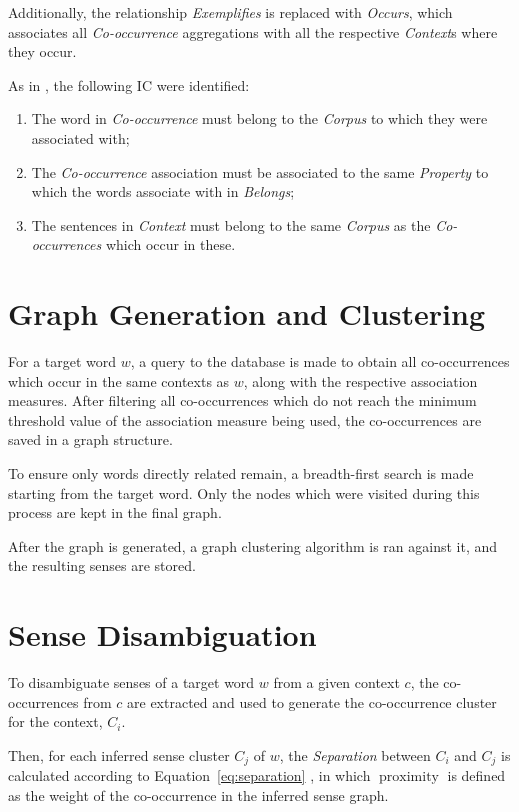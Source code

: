 Additionally, the relationship \emph{Exemplifies} is replaced with
\emph{Occurs}, which associates all \emph{Co-occurrence} aggregations with all
the respective \emph{Context}s where they occur.

As in \citep{correia2015syntax}, the following \ac{IC} were identified:

\begin{enumerate}
  \item The word in \emph{Co-occurrence} must belong to the \emph{Corpus} to
    which they were associated with;
  \item The \emph{Co-occurrence} association must be associated to the same
    \emph{Property} to which the words associate with in \emph{Belongs};
  \item The sentences in \emph{Context} must belong to the same \emph{Corpus}
    as the \emph{Co-occurrences} which occur in these.
\end{enumerate}

\section{Graph Generation and Clustering}

For a target word $w$, a query to the database is made to obtain all
co-occurrences which occur in the same contexts as $w$, along with the
respective association measures. After filtering all co-occurrences which do not
reach the minimum threshold value of the association measure being used, the
co-occurrences are saved in a graph structure.

To ensure only words directly related remain, a breadth-first search is made
starting from the target word. Only the nodes which were visited during this
process are kept in the final graph.

After the graph is generated, a graph clustering algorithm is ran against it,
and the resulting senses are stored.

\section{Sense Disambiguation}

To disambiguate senses of a target word $w$ from a given context
$c$, the co-occurrences from $c$ are extracted and used to generate
the co-occurrence cluster for the context, $C_i$.

Then, for each inferred sense cluster $C_j$ of $w$, the
\emph{Separation} between $C_i$ and $C_j$ is calculated according to
Equation~\ref{eq:separation} \citep{hope2013uos}, in which
$\operatorname{proximity}$ is defined as the weight of the co-occurrence in the
inferred sense graph.

